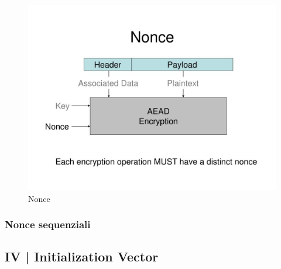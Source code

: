 \begin{figure}[H]
	\centering
	\includegraphics[width=.9\textwidth, height=.9\textheight, keepaspectratio]{./images/iv_nonce_salt_pepper/nonce.png}
	\caption{Nonce}
	\label{fig:nonce}
\end{figure}

\subsubsection{Nonce sequenziali}


\textsf{\small }


\subsection{IV | Initialization Vector} %




